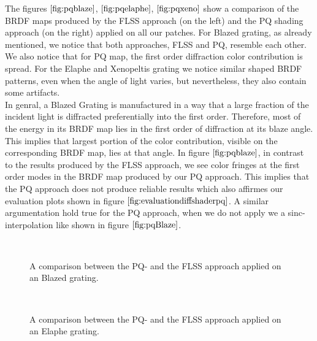 The figures $\ref{fig:pqblaze}$, $\ref{fig:pqelaphe}$, $\ref{fig:pqxeno}$ show a comparison of the BRDF maps produced by the FLSS approach (on the left) and the PQ shading approach (on the right) applied on all our patches. For Blazed grating, as already mentioned, we notice that both approaches, FLSS and PQ, resemble each other. We also notice that for PQ map, the first order diffraction color contribution is spread. For the Elaphe and Xenopeltis grating we notice similar shaped BRDF patterns, even when the angle of light varies, but nevertheless, they also contain some artifacts. \\

In genral, a Blazed Grating is manufactured in a way that a large fraction of the incident light is diffracted preferentially into the first order. Therefore, most of the energy in its BRDF map lies in the first order of diffraction at its blaze angle. This implies that largest portion of the color contribution, visible on the corresponding BRDF map, lies at that angle. In figure $\ref{fig:pqblaze}$, in contrast to the results produced by the FLSS approach, we see color fringes at the first order modes in the BRDF map produced by our PQ approach. This implies that the PQ approach does not produce reliable results which also affirmes our evaluation plots shown in figure $\ref{fig:evaluationdiffshaderpq}$. A similar argumentation hold true for the PQ approach, when we do not apply we a sinc-interpolation like shown in figure $\ref{fig:pqBlaze}$.

\begin{figure}[H]
  \centering
~
~
\caption[BRDF Map: PQ vs FLSS Approach on Blazed Grating]{A comparison between the PQ- and the FLSS approach applied on an Blazed grating.}
\label{fig:pqblaze}
\end{figure}

\begin{figure}[H]
  \centering
~

\caption[BRDF Map: PQ vs FLSS Approach on Elaphe Grating]{A comparison between the PQ- and the FLSS approach applied on an Elaphe grating.}
\label{fig:pqelaphe}
\end{figure}

